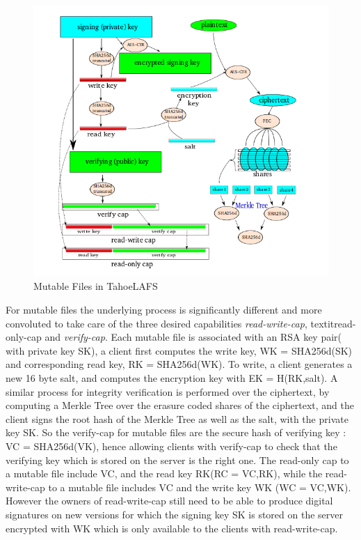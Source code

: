 \begin{figure}[h]
\centering
\includegraphics[scale = 0.2]{img/mutable}
\caption{Mutable Files in TahoeLAFS}
\label{mutable}
\end{figure}

For mutable files the underlying process is significantly different and more convoluted to take care of the three desired capabilities \textit{read-write-cap}, textit{read-only-cap} and \textit{verify-cap}. Each mutable file is associated with an RSA key pair( with private key SK), a client first computes the write key, WK = SHA256d(SK) and corresponding read key, RK = SHA256d(WK). To write, a client generates a new 16 byte salt, and computes the encryption key with EK = H(RK,salt). A similar process for integrity verification is performed over the ciphertext, by computing a Merkle Tree over the erasure coded shares of the ciphertext, and the client signs the root hash of the Merkle Tree as well as the salt, with the private key SK. So the verify-cap for mutable files are the secure hash of verifying key : VC = SHA256d(VK), hence allowing clients with verify-cap to check that the verifying key which is stored on the server is the right one. The read-only cap to a mutable file include VC, and the read key RK(RC = VC,RK), while the read-write-cap to a mutable file includes VC and the write key WK (WC = VC,WK). However the owners of read-write-cap still need to be able to produce digital signatures on new versions for which the signing key SK is stored on the server encrypted with WK which is only available to the clients with read-write-cap. 

